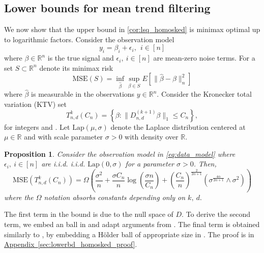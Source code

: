 \documentclass[ejs,noshowframe]{imsart}
\makeatletter
\theoremstyle{plain}
\newtheorem{proposition}[theorem]{Proposition}
\theoremstyle{definition}
\newcommand{\aref}[1]{\hyperref[#1]{Appendix~\ref*{#1}}}
\newcommand{\R}{\mathbb{R}}
\newcommand{\E}{E}
\renewcommand{\hat}{\widehat}
\newcommand*{\iid}{%
    \@ifnextchar{.}%
        {i.i.d.}%
        {i.i.d.\@\xspace}%
}
\newcommand{\lap}{\mathrm{Lap}}
\newcommand{\ktvset}{T}
\makeatother
\begin{document}
\subsection{Lower bounds for mean trend filtering}
\label{sec:lower-bounds-mean}

We now show that the upper bound in \autoref{cor:lsq_homosked} is minimax 
optimal up to logarithmic factors.
Consider the observation model
\begin{equation}
\label{eq:data_model}
	y_i = \beta_i + \epsilon_i,\ \ i\in [n]
\end{equation}
where $\beta \in \R^n$ is the true signal and $\epsilon_i,\ i\in[n]$ are mean-zero 
noise terms. 
For a set $S \subset \R^n$ denote its minimax risk
\begin{equation}
  \textrm{MSE}(S)
  = \inf_{\hat\beta} \sup_{\beta \in S}  \E\left[ \| \hat \beta - \beta 
\|_n^2 \right] 
\end{equation}
where $\hat\beta$ is measurable in the observations $y \in \R^n.$
Consider the Kronecker total variation (KTV) set 
\begin{equation}
	T_{n,d}^k(C_n) = \left\{ \beta : \|D_{n,d}^{(k+1)} \beta \|_1 \leq C_n \right\},
\end{equation}
for integers  and 
.
Let $\lap(\mu, \sigma)$ denote the Laplace distribution centered at $\mu 
\in \R$ and with scale parameter $\sigma > 0$ with
density 
 over $\R$.
\begin{proposition}
\label{prop:lowerbd_homosked}
Consider the observation model in \eqref{eq:data_model}
where $\epsilon_i,\ i \in [n]$ are \iid $\lap(0, \sigma)$
for a parameter $\sigma > 0$. 
Then,
\begin{equation}
  \mathrm{MSE}
  \left( \ktvset_{n,d}^k(C_n)\right) 
 =
\Omega \left(
\frac{ \sigma^2}{n}
	+ \frac{\sigma C_n}{n}  \log \left(\frac{\sigma n}{C_n}\right) 
	+ \left( \frac{C_n}{n} \right)^{\frac{2}{2\alpha+1}} 
\left(\sigma^{\frac{4\alpha}{2\alpha+1}} \wedge \sigma^2\right)
\right)
\end{equation}
where the $\Omega$ notation absorbs constants depending only on $k,\ d.$
\end{proposition}

The first term in the bound is due to the null space of $D.$ 
To derive the second term, 
we embed an  ball in \smash{$\ktvset_{n,d}^k (C_n)$} and adapt 
arguments from 
\cite{birge2001gaussian}.
The final term is obtained similarly to \citet[Theorem 4]{SadhanalaWang2017},  
by
embedding a H\"older ball of appropriate size in
\smash{$ \ktvset_{n,d}^k (C_n)$}.
The proof is in \aref{sec:lowerbd_homosked_proof}.
\noindent
\end{document}
